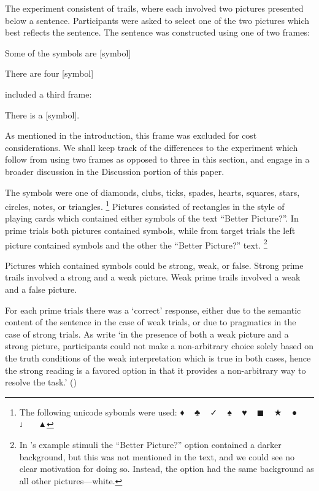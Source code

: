 \documentclass[10pt]{article}
\begin{document}
\begin{multicols}{2}
The experiment consistent of trails, where each involved two pictures presented below a sentence.
Participants were asked to select one of the two pictures which best reflects the sentence.
The sentence was constructed using one of two frames:
\begin{enumerate*}[label=(\roman*)]
\item Some of the symbols are [symbol]
\item There are four [symbol]
\end{enumerate*}
\citeauthor{Bott:2016aa} included a third frame:
\begin{enumerate*}[label=(\roman*), resume]
\item There is a [symbol].
\end{enumerate*}
As mentioned in the introduction, this frame was excluded for cost considerations.
We shall keep track of the differences to the experiment which follow from using two frames as opposed to three in this section, and engage in a broader discussion in the Discussion portion of this paper.

The symbols were one of diamonds, clubs, ticks, spades, hearts, squares, stars, circles, notes, or triangles.\nolinebreak
\footnote{The following unicode sybomls were used: {\space\unifont ♦\space} \mbox{ }  {\space\unifont ♣\space} \mbox{ } {\space\unifont ✓\space} \mbox{ } {\space\unifont ♠\space} \mbox{ } {\space\unifont ♥\space} \mbox{ } {\space\unifont ◼\space} \mbox{ } {\space\unifont ★\space} \mbox{ } {\space\unifont ●\space} \mbox{ } {\space\unifont ♩\space} \mbox{ } {\space\unifont ▲}}
Pictures consisted of rectangles in the style of playing cards which contained either symbols of the text ``Better Picture?''.
In prime trials both pictures contained symbols, while from target trials the left picture contained symbols and the other the ``Better Picture?'' text.\nolinebreak
\footnote{In \citeauthor{Bott:2016aa}'s example stimuli the ``Better Picture?'' option contained a darker background, but this was not mentioned in the text, and we could see no clear motivation for doing so.
Instead, the option had the same background as all other pictures---white.}

Pictures which contained symbols could be strong, weak, or false.
Strong prime trails involved a strong and a weak picture.
Weak prime trails involved a weak and a false picture.

For each prime trials there was a `correct' response, either due to the semantic content of the sentence in the case of weak trials, or due to pragmatics in the case of strong trials.
As \citeauthor{Bott:2016aa} write `in the presence of both a weak picture and a strong picture, participants could not make a non-arbitrary choice solely based on the truth conditions of the weak interpretation which is true in both cases, hence the strong reading is a favored option in that it provides a non-arbitrary way to resolve the task.'
(\citeyear[124]{Bott:2016aa})


\end{multicols}
\end{document}
